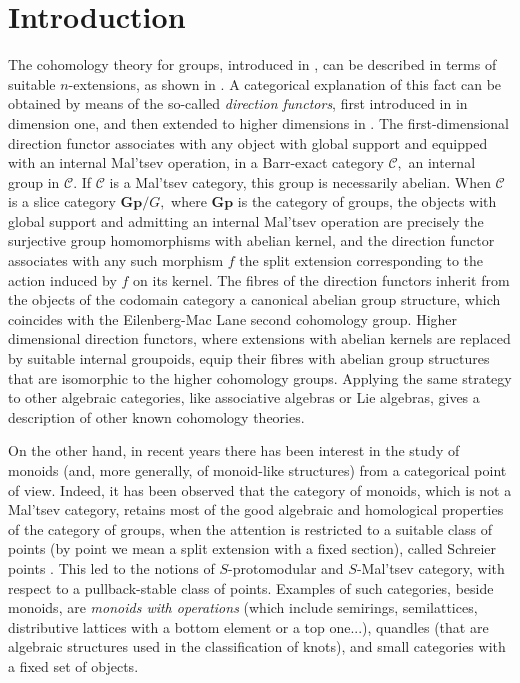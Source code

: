 \documentclass[11pt]{amsart}
\theoremstyle{plain}
\theoremstyle{definition}
\theoremstyle{remark}
\begin{document}
\section{Introduction}
The cohomology theory for groups, introduced in \cite{EML}, can be described in terms of suitable $n$-extensions, as shown in \cite{holt, huebschmann}. A categorical explanation of this fact can be obtained by means of the so-called \emph{direction functors}, first introduced in \cite{baer-sums} in dimension one, and then extended to higher dimensions in \cite{bourn-rodelo}. The first-dimensional direction functor associates with any object with global support and equipped with an internal Mal'tsev operation, in a Barr-exact \cite{barr} category $\mathcal{C},$ an internal group in $\mathcal{C}.$ If $\mathcal{C}$ is a Mal'tsev \cite{carboni} category, this group is necessarily abelian. When $\mathcal{C}$ is a slice category $\mathbf{Gp}/G,$ where $\mathbf{Gp}$ is the category of groups, the objects with global support and admitting an internal Mal'tsev operation are precisely the surjective group homomorphisms with abelian kernel, and the direction functor associates with any such morphism $f$ the split extension corresponding to the action induced by $f$ on its kernel. The fibres of the direction functors inherit from the objects of the codomain category a canonical abelian group structure, which coincides with the Eilenberg-Mac Lane second cohomology group. Higher dimensional direction functors, where extensions with abelian kernels are replaced by suitable internal groupoids, equip their fibres with abelian group structures that are isomorphic to the higher cohomology groups. Applying the same strategy to other algebraic categories, like associative algebras or Lie algebras, gives a description of other known cohomology theories.

On the other hand, in recent years there has been interest in the study of monoids (and, more generally, of monoid-like structures) from a categorical point of view. Indeed, it has been observed that the category of monoids, which is not a Mal'tsev category, retains most of the good algebraic and homological properties of the category of groups, when the attention is restricted to a suitable class of points (by point we mean a split extension with a fixed section), called Schreier points \cite{MMS13, schreier_book}. This led to the notions of $S$-protomodular \cite{S-protomodular} and $S$-Mal'tsev \cite{mal'tsev-reflection} category, with respect to a pullback-stable class of points. Examples of such categories, beside monoids, are \emph{monoids with operations} \cite{MMS13} (which include semirings, semilattices, distributive lattices with a bottom element or a top one...), quandles (that are algebraic structures used in the classification of knots), and small categories with a fixed set of objects.
\end{document}
